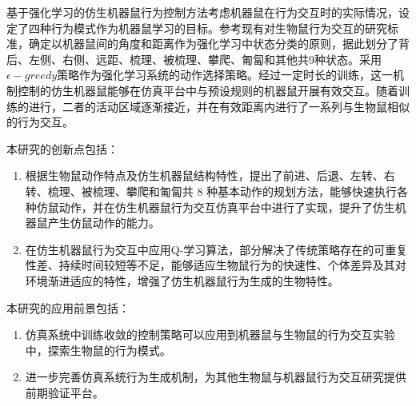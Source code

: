 基于强化学习的仿生机器鼠行为控制方法考虑机器鼠在行为交互时的实际情况，设定了四种行为模式作为机器鼠学习的目标。参考现有对生物鼠行为交互的研究标准，确定以机器鼠间的角度和距离作为强化学习中状态分类的原则，据此划分了背后、左侧、右侧、远距、梳理、被梳理、攀爬、匍匐和其他共9种状态。采用$\epsilon-greedy$策略作为强化学习系统的动作选择策略。经过一定时长的训练，这一机制控制的仿生机器鼠能够在仿真平台中与预设规则的机器鼠开展有效交互。随着训练的进行，二者的活动区域逐渐接近，并在有效距离内进行了一系列与生物鼠相似的行为交互。

本研究的创新点包括：
\begin{enumerate}[leftmargin=0em, listparindent=2em, parsep=0em, topsep=0em, label=（\theenumi）]
\setlength{\itemindent}{4em}
\setlength{\labelsep}{0em}
\setlength{\labelwidth}{2em}
\setlength{\parsep}{0em}
\setlength{\itemsep}{0em}
\setlength{\topsep}{0em}
  \item 根据生物鼠动作特点及仿生机器鼠结构特性，提出了前进、后退、左转、右转、梳理、被梳理、攀爬和匍匐共 8 种基本动作的规划方法，能够快速执行各种仿鼠动作，并在仿生机器鼠行为交互仿真平台中进行了实现，提升了仿生机器鼠产生仿鼠动作的能力。
  \item 在仿生机器鼠行为交互中应用Q-学习算法，部分解决了传统策略存在的可重复性差、持续时间较短等不足，能够适应生物鼠行为的快速性、个体差异及其对环境渐进适应的特性，增强了仿生机器鼠行为生成的生物特性。
\end{enumerate}

本研究的应用前景包括：
\begin{enumerate}[leftmargin=0em, listparindent=2em, parsep=0em, topsep=0em, label=（\theenumi）]
\setlength{\itemindent}{4em}
\setlength{\labelsep}{0em}
\setlength{\labelwidth}{2em}
\setlength{\parsep}{0em}
\setlength{\itemsep}{0em}
\setlength{\topsep}{0em}
  \item 仿真系统中训练收敛的控制策略可以应用到机器鼠与生物鼠的行为交互实验中，探索生物鼠的行为模式。
  \item 进一步完善仿真系统行为生成机制，为其他生物鼠与机器鼠行为交互研究提供前期验证平台。
\end{enumerate}
%
